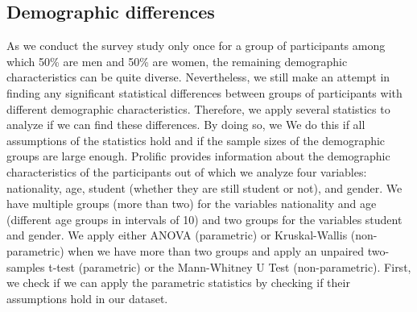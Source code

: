 \subsection{Demographic differences}
\label{sec:analysis-demographic}
As we conduct the survey study only once for a group of participants among which 50\% are men and 50\% are women, the remaining demographic characteristics can be quite diverse.
%
Nevertheless, we still make an attempt in finding any significant statistical differences between groups of participants with different demographic characteristics.
%
Therefore, we apply several statistics to analyze if we can find these differences.
%
By doing so, we
We do this if all assumptions of the statistics hold and if the sample sizes of the demographic groups are large enough.
%
Prolific provides information about the demographic characteristics of the participants out of which we analyze four variables: nationality, age, student (whether they are still student or not), and gender.
%
We have multiple groups (more than two) for the variables nationality and age (different age groups in intervals of 10) and two groups for the variables student and gender.
%
We apply either ANOVA (parametric) or Kruskal-Wallis (non-parametric) when we have more than two groups and apply an unpaired two-samples t-test (parametric) or the Mann-Whitney U Test (non-parametric).
%
First, we check if we can apply the parametric statistics by checking if their assumptions hold in our dataset.
%

